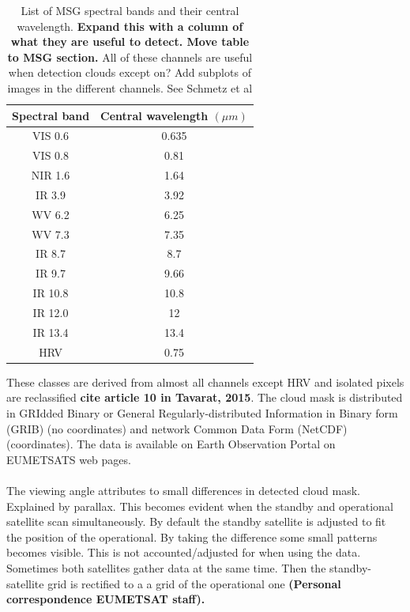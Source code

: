 \begin{table}[]
    \centering
    \begin{tabular}{c|c}
        Spectral band & Central wavelength $\left( \mu m  \right)$ \\ \hline
        VIS 0.6 & 0.635 \\
        VIS 0.8 & 0.81 \\
        NIR 1.6 & 1.64 \\
        IR 3.9 & 3.92 \\
        WV 6.2 & 6.25 \\
        WV 7.3 & 7.35 \\ 
        IR 8.7 & 8.7 \\
        IR 9.7 & 9.66 \\
        IR 10.8 & 10.8 \\
        IR 12.0 & 12 \\
        IR 13.4 & 13.4 \\
        HRV & 0.75
    \end{tabular}
    \caption{List of MSG spectral bands and their central wavelength. \textbf{Expand this with a column of what they are useful to detect. Move table to MSG section. } All of these channels are useful when detection clouds except on? Add subplots of images in the different channels. See Schmetz et al }
    \label{tab:msg_spectral_bands}
\end{table}
These classes are derived from almost all channels except HRV and isolated pixels are reclassified \textbf{cite article 10 in Tavarat, 2015}. The cloud mask is distributed in GRIdded Binary or General Regularly-distributed Information in Binary form (GRIB) (no coordinates) and network Common Data Form (NetCDF) (coordinates). The data is available on Earth Observation Portal on EUMETSATS web pages. 
\\ \\ 
The viewing angle attributes to small differences in detected cloud mask. Explained by parallax. This becomes evident when the standby and operational satellite scan simultaneously. By default the standby satellite is adjusted to fit the position of the operational. By taking the difference some small patterns becomes visible. This is not accounted/adjusted for when using the data. Sometimes both satellites gather data at the same time. Then the standby-satellite grid is rectified to a a grid of the operational one \textbf{(Personal correspondence EUMETSAT staff).} 

